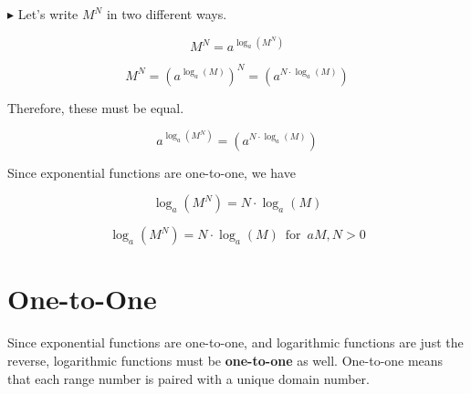 \documentclass{ximera}
\begin{document}
$\blacktriangleright$  Let's write $M^N$ in two different ways.



\[   M^N = a^{\log_a(M^N)}                  \]

\[   M^N = (a^{\log_a(M)})^N =     (a^{N \cdot \log_a(M)})             \]


Therefore, these must be equal.


\[    a^{\log_a(M^N)}      =    (a^{N \cdot \log_a(M)})                \]





Since exponential functions are one-to-one, we have 


\[    \log_a(M^N)    =   N \cdot \log_a(M)            \]








\begin{template} 

\[    \log_a(M^N)    =   N \cdot \log_a(M)       \, \text{ for } \, a M, N  > 0        \]


\end{template}


















\section{One-to-One}







Since exponential functions are one-to-one, and logarithmic functions are just the reverse, logarithmic functions must be \textbf{one-to-one} as well. One-to-one means that each range number is paired with a unique domain number.
\end{document}
